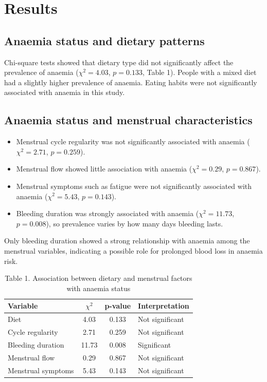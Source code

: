 \documentclass{article}
\begin{document}
\section{Results}
\subsection{Anaemia status and dietary patterns}
Chi-square tests showed that dietary type did not significantly affect the prevalence of anaemia ($\chi^2 = 4.03$, $p = 0.133$, Table 1). People with a mixed diet had a slightly higher prevalence of anaemia. Eating habits were not significantly associated with anaemia in this study.

\subsection{Anaemia status and menstrual characteristics}
\begin{itemize}
  \item Menstrual cycle regularity was not significantly associated with anaemia ($\chi^2 = 2.71$, $p = 0.259$).
  \item Menstrual flow showed little association with anaemia ($\chi^2 = 0.29$, $p = 0.867$).
  \item Menstrual symptoms such as fatigue were not significantly associated with anaemia ($\chi^2 = 5.43$, $p = 0.143$).
  \item Bleeding duration was strongly associated with anaemia ($\chi^2 = 11.73$, $p = 0.008$), so prevalence varies by how many days bleeding lasts.
\end{itemize}
Only bleeding duration showed a strong relationship with anaemia among the menstrual variables, indicating a possible role for prolonged blood loss in anaemia risk.

\begin{table}
\caption{Table 1. Association between dietary and menstrual factors with anaemia status}
\begin{tabular}{|l|c|c|l|}
\hline
Variable & $\chi^2$ & p-value & Interpretation \\
\hline
Diet & 4.03 & 0.133 & Not significant \\
Cycle regularity & 2.71 & 0.259 & Not significant \\
Bleeding duration & 11.73 & 0.008 & Significant \\
Menstrual flow & 0.29 & 0.867 & Not significant \\
Menstrual symptoms & 5.43 & 0.143 & Not significant \\
\hline
\end{tabular}
\end{table}
\end{document}
